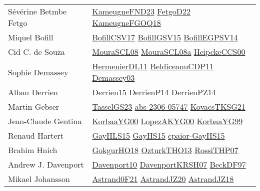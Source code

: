 {\begin{longtable}{p{4cm}p{20cm}}
S{\'{e}}v{\'{e}}rine Betmbe Fetgo & \href{papers/KameugneFND23.pdf}{KameugneFND23}\cite{KameugneFND23} \href{articles/FetgoD22.pdf}{FetgoD22}\cite{FetgoD22} \href{papers/KameugneFGOQ18.pdf}{KameugneFGOQ18}\cite{KameugneFGOQ18} \\
Miquel Bofill & \href{papers/BofillCSV17.pdf}{BofillCSV17}\cite{BofillCSV17} \href{papers/BofillGSV15.pdf}{BofillGSV15}\cite{BofillGSV15} \href{papers/BofillEGPSV14.pdf}{BofillEGPSV14}\cite{BofillEGPSV14} \\
Cid C. de Souza & \href{papers/MouraSCL08.pdf}{MouraSCL08}\cite{MouraSCL08} \href{papers/MouraSCL08a.pdf}{MouraSCL08a}\cite{MouraSCL08a} \href{articles/HeipckeCCS00.pdf}{HeipckeCCS00}\cite{HeipckeCCS00} \\
Sophie Demassey & \href{papers/HermenierDL11.pdf}{HermenierDL11}\cite{HermenierDL11} \href{articles/BeldiceanuCDP11.pdf}{BeldiceanuCDP11}\cite{BeldiceanuCDP11} \href{}{Demassey03}\cite{Demassey03} \\
Alban Derrien & \href{}{Derrien15}\cite{Derrien15} \href{papers/DerrienP14.pdf}{DerrienP14}\cite{DerrienP14} \href{papers/DerrienPZ14.pdf}{DerrienPZ14}\cite{DerrienPZ14} \\
Martin Gebser & \href{papers/TasselGS23.pdf}{TasselGS23}\cite{TasselGS23} \href{articles/abs-2306-05747.pdf}{abs-2306-05747}\cite{abs-2306-05747} \href{papers/KovacsTKSG21.pdf}{KovacsTKSG21}\cite{KovacsTKSG21} \\
Jean{-}Claude Gentina & \href{articles/KorbaaYG00.pdf}{KorbaaYG00}\cite{KorbaaYG00} \href{articles/LopezAKYG00.pdf}{LopezAKYG00}\cite{LopezAKYG00} \href{papers/KorbaaYG99.pdf}{KorbaaYG99}\cite{KorbaaYG99} \\
Renaud Hartert & \href{papers/GayHLS15.pdf}{GayHLS15}\cite{GayHLS15} \href{papers/GayHS15.pdf}{GayHS15}\cite{GayHS15} \href{papers/cpaior-GayHS15.pdf}{cpaior-GayHS15}\cite{cpaior-GayHS15} \\
Brahim Hnich & \href{articles/GokgurHO18.pdf}{GokgurHO18}\cite{GokgurHO18} \href{articles/OzturkTHO13.pdf}{OzturkTHO13}\cite{OzturkTHO13} \href{papers/RossiTHP07.pdf}{RossiTHP07}\cite{RossiTHP07} \\
Andrew J. Davenport & \href{papers/Davenport10.pdf}{Davenport10}\cite{Davenport10} \href{papers/DavenportKRSH07.pdf}{DavenportKRSH07}\cite{DavenportKRSH07} \href{papers/BeckDF97.pdf}{BeckDF97}\cite{BeckDF97} \\
Mikael Johansson & \href{papers/Astrand0F21.pdf}{Astrand0F21}\cite{Astrand0F21} \href{articles/AstrandJZ20.pdf}{AstrandJZ20}\cite{AstrandJZ20} \href{papers/AstrandJZ18.pdf}{AstrandJZ18}\cite{AstrandJZ18} \\

\end{longtable}}
